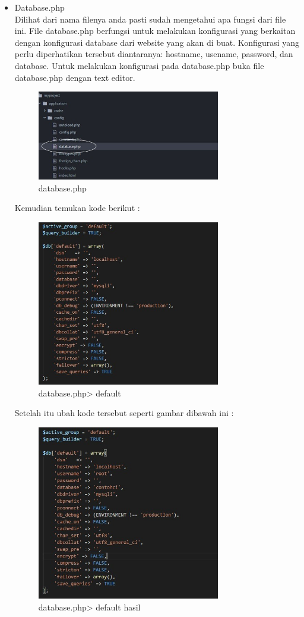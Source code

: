 \begin{itemize}
	\item Database.php
	\hfill\\
	Dilihat dari nama filenya anda pasti sudah mengetahui apa fungsi dari file ini. File database.php berfungsi untuk melakukan konfigurasi yang berkaitan dengan konfigurasi database dari website  yang akan di buat. Konfigurasi yang perlu diperhatikan tersebut diantaranya: hostname, usename, password, dan database. 
Untuk melakukan konfigurasi pada database.php buka file database.php dengan text editor.
		\begin{figure}[H]
			\includegraphics[width=8cm]{figures/instalasi/ci35.jpg}
			\centering
			\caption{database.php}
		\end{figure}
	Kemudian temukan kode berikut :
		\begin{figure}[H]
			\includegraphics[width=8cm]{figures/instalasi/ci36.jpg}
			\centering
			\caption{database.php> default}
		\end{figure}	
		Setelah itu ubah kode tersebut seperti gambar dibawah ini :
		\begin{figure}[H]
			\includegraphics[width=8cm]{figures/instalasi/ci37.jpg}
			\centering
			\caption{database.php> default hasil}
		\end{figure}	
	\end{itemize}

